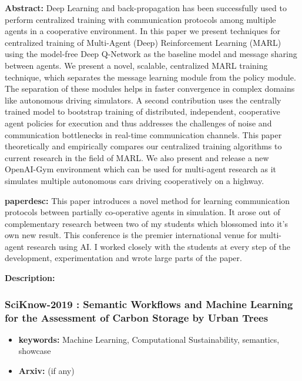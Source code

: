 \documentclass{article}
\begin{document}
\textbf{Abstract:} Deep Learning and back-propagation has been successfully used to perform centralized training with communication protocols among multiple agents in a cooperative environment. In this paper we present techniques for centralized training of Multi-Agent (Deep) Reinforcement Learning (MARL) using the model-free Deep Q-Network as the baseline model and message sharing between agents. We present a novel, scalable, centralized MARL training technique, which separates the message learning module from the policy module. The separation of these modules helps in faster convergence in complex domains like autonomous driving simulators. A second contribution uses the centrally trained model to bootstrap training of distributed, independent, cooperative agent policies for execution and thus addresses the challenges of noise and communication bottlenecks in real-time communication channels. This paper theoretically and empirically compares our centralized training algorithms to current research in the field of MARL. We also present and release a new OpenAI-Gym environment which can be used for multi-agent research as it simulates multiple autonomous cars driving cooperatively on a highway.

\textbf{paperdesc:} This paper introduces a novel method for learning communication protocols between partially co-operative agents in simulation. It arose out of complementary research between two of my students which blossomed into it's own new result. This conference is the premier international venue for multi-agent research using AI. I worked closely with the students at every step of the development, experimentation and wrote large parts of the paper.

\textbf{Description:} 



\newpage
\subsubsection{\textbf{SciKnow-2019} : Semantic Workflows and Machine Learning for the Assessment of Carbon Storage by Urban Trees}
\begin{itemize}
\item \textbf{keywords:} Machine Learning, Computational Sustainability, semantics, showcase
\item \textbf{Arxiv:}  (if any)
\end{itemize}
\end{document}
